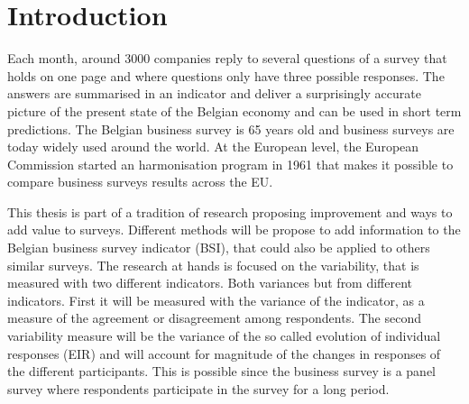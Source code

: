\documentclass[12pt,a4paper,oneside]{book}
\begin{document}
\chapter{Introduction}






Each month, around 3000 companies reply to several questions of a survey that holds on one page and where questions only have three possible responses.
The answers are summarised in an indicator and deliver a surprisingly accurate picture of the present state of the Belgian economy and can be used in short term predictions.
The Belgian business survey is 65 years old and business surveys are today widely used around the world. 
At the European level, the European Commission started an harmonisation program in 1961 that makes it possible to compare business surveys results across the EU.

This thesis is part of a tradition of research proposing improvement and ways to add value to surveys. Different methods will be propose to add information to the Belgian business survey indicator (BSI), that could also be applied to others similar surveys.
The research at hands is focused on the variability, that is measured with two different indicators. Both variances but from different indicators.
First it will be measured with the variance of the indicator, as a measure of the agreement or disagreement among respondents.
The second variability measure will be the variance of the so called evolution of individual responses (EIR) and will account for magnitude of the changes in responses of the different participants. This is possible since the business survey is a panel survey where respondents participate in the survey for a long period.

\end{document}
